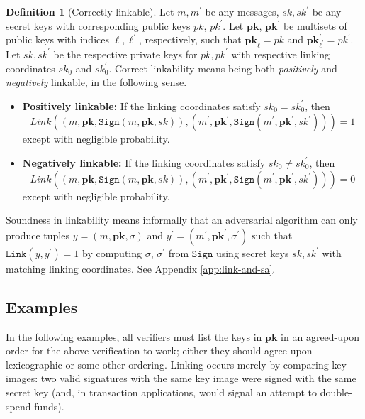 \documentclass{mrl}
\theoremstyle{plain}
\theoremstyle{definition}
\newtheorem{definition}{Definition}[section]
\begin{document}
\begin{definition}[Correctly linkable]
Let $m, m^\prime$ be any messages, $\textit{sk}, \textit{sk}^\prime$ be any secret keys with corresponding public keys $\textit{pk}$, $\textit{pk}^\prime$. Let $\textbf{pk}$, $\textbf{pk}^\prime$ be multisets of public keys with indices $\ell, \ell^\prime$, respectively, such that $\textbf{pk}_\ell = \textit{pk}$ and $\textbf{pk}^\prime_{\ell^\prime} = \textit{pk}^\prime$. Let $\textit{sk}, \textit{sk}^\prime$ be the respective private keys for $\textit{pk}, \textit{pk}^\prime$ with respective linking coordinates $\textit{sk}_0$ and $\textit{sk}^\prime_0$. Correct linkability means being both \textit{positively} and \textit{negatively} linkable, in the following sense.
\begin{itemize}
\item \textbf{Positively linkable:} If the linking coordinates satisfy $\textit{sk}_0 = \textit{sk}^\prime_0$, then \[\textit{Link}((m, \textbf{pk}, \texttt{Sign}(m, \textbf{pk}, sk)), (m^\prime, \textbf{pk}^\prime, \texttt{Sign}(m^\prime, \textbf{pk}^\prime, sk^\prime)))=1\] except with negligible probability.

\item \textbf{Negatively linkable:} If the linking coordinates satisfy $\textit{sk}_0 \neq \textit{sk}^\prime_0$, then \[\textit{Link}((m, \textbf{pk}, \texttt{Sign}(m, \textbf{pk}, sk)), (m^\prime, \textbf{pk}^\prime, \texttt{Sign}(m^\prime, \textbf{pk}^\prime, sk^\prime)))=0\] except with negligible probability.
\end{itemize}
\end{definition}

Soundness in linkability means informally that an adversarial algorithm can only produce tuples $y=(m, \textbf{pk}, \sigma)$ and $y^\prime =(m^\prime, \textbf{pk}^\prime, \sigma^\prime)$ such that $\texttt{Link}(y, y^\prime)=1$ by computing $\sigma$, $\sigma^\prime$ from $\texttt{Sign}$ using secret keys $\textit{sk}, \textit{sk}^\prime$ with matching linking coordinates. See Appendix \ref{app:link-and-sa}.


\subsection{Examples}
In the following examples, all verifiers must list the keys in $\textbf{pk}$ in an agreed-upon order for the above verification to work; either they should agree upon lexicographic or some other ordering.  Linking occurs merely by comparing key images: two valid signatures with the same key image were signed with the same secret key (and, in transaction applications, would signal an attempt to double-spend funds).
\end{document}
